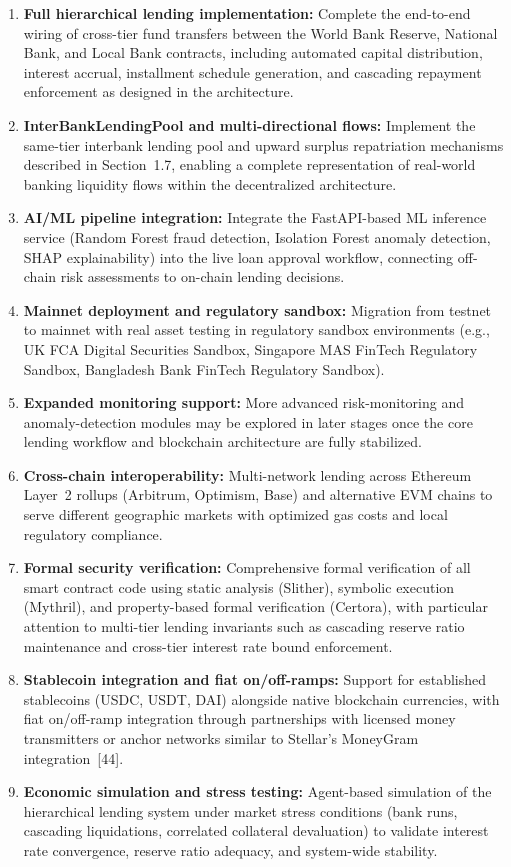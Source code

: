 \documentclass[12pt,a4paper]{report}
\begin{document}
\begin{enumerate}[noitemsep]
\item \textbf{Full hierarchical lending implementation:} Complete the end-to-end wiring of cross-tier fund transfers between the World Bank Reserve, National Bank, and Local Bank contracts, including automated capital distribution, interest accrual, installment schedule generation, and cascading repayment enforcement as designed in the architecture.
\item \textbf{InterBankLendingPool and multi-directional flows:} Implement the same-tier interbank lending pool and upward surplus repatriation mechanisms described in Section~1.7, enabling a complete representation of real-world banking liquidity flows within the decentralized architecture.
\item \textbf{AI/ML pipeline integration:} Integrate the FastAPI-based ML inference service (Random Forest fraud detection, Isolation Forest anomaly detection, SHAP explainability) into the live loan approval workflow, connecting off-chain risk assessments to on-chain lending decisions.
\item \textbf{Mainnet deployment and regulatory sandbox:} Migration from testnet to mainnet with real asset testing in regulatory sandbox environments (e.g., UK FCA Digital Securities Sandbox, Singapore MAS FinTech Regulatory Sandbox, Bangladesh Bank FinTech Regulatory Sandbox).
\item \textbf{Expanded monitoring support:} More advanced risk-monitoring and anomaly-detection modules may be explored in later stages once the core lending workflow and blockchain architecture are fully stabilized.
\item \textbf{Cross-chain interoperability:} Multi-network lending across Ethereum Layer~2 rollups (Arbitrum, Optimism, Base) and alternative EVM chains to serve different geographic markets with optimized gas costs and local regulatory compliance.
\item \textbf{Formal security verification:} Comprehensive formal verification of all smart contract code using static analysis (Slither), symbolic execution (Mythril), and property-based formal verification (Certora), with particular attention to multi-tier lending invariants such as cascading reserve ratio maintenance and cross-tier interest rate bound enforcement.
\item \textbf{Stablecoin integration and fiat on/off-ramps:} Support for established stablecoins (USDC, USDT, DAI) alongside native blockchain currencies, with fiat on/off-ramp integration through partnerships with licensed money transmitters or anchor networks similar to Stellar's MoneyGram integration~[44].
\item \textbf{Economic simulation and stress testing:} Agent-based simulation of the hierarchical lending system under market stress conditions (bank runs, cascading liquidations, correlated collateral devaluation) to validate interest rate convergence, reserve ratio adequacy, and system-wide stability.
\end{enumerate}
\end{document}
